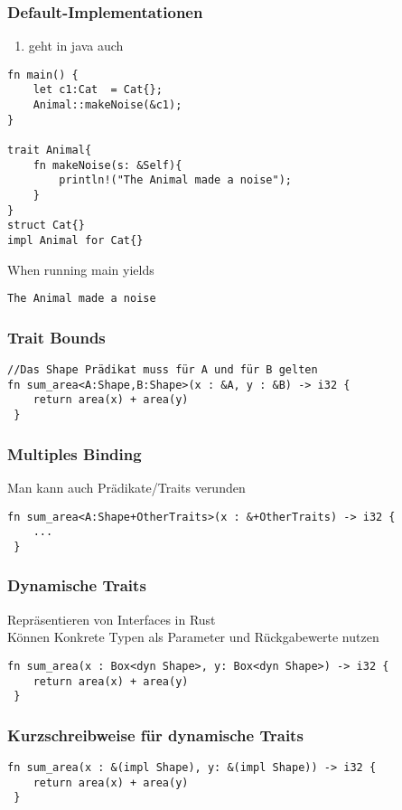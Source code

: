 \documentclass[a4paper, 1ppt]{article}
\begin{document}
\subsubsection{Default-Implementationen}
\begin{enumerate}
	\item geht in java auch
\end{enumerate}
\begin{verbatim}
fn main() {
    let c1:Cat  = Cat{};
    Animal::makeNoise(&c1);
}

trait Animal{
    fn makeNoise(s: &Self){
        println!("The Animal made a noise");
    }
}
struct Cat{}
impl Animal for Cat{}
\end{verbatim}
When running main yields
\begin{verbatim}
The Animal made a noise
\end{verbatim}
\subsubsection{Trait Bounds}
\begin{verbatim}
//Das Shape Prädikat muss für A und für B gelten
fn sum_area<A:Shape,B:Shape>(x : &A, y : &B) -> i32 {
    return area(x) + area(y)
 }
\end{verbatim}
\subsubsection{Multiples Binding}
Man kann auch Prädikate/Traits verunden
\begin{verbatim}
fn sum_area<A:Shape+OtherTraits>(x : &+OtherTraits) -> i32 {
	...
 }
\end{verbatim}
\subsubsection{Dynamische Traits}
Repräsentieren von Interfaces in Rust \\
Können Konkrete Typen als Parameter und Rückgabewerte nutzen
\begin{verbatim}
fn sum_area(x : Box<dyn Shape>, y: Box<dyn Shape>) -> i32 {
    return area(x) + area(y)
 }
\end{verbatim}
\subsubsection{Kurzschreibweise für dynamische Traits}
\begin{verbatim}
fn sum_area(x : &(impl Shape), y: &(impl Shape)) -> i32 {
    return area(x) + area(y)
 }
\end{verbatim}
\end{document}

